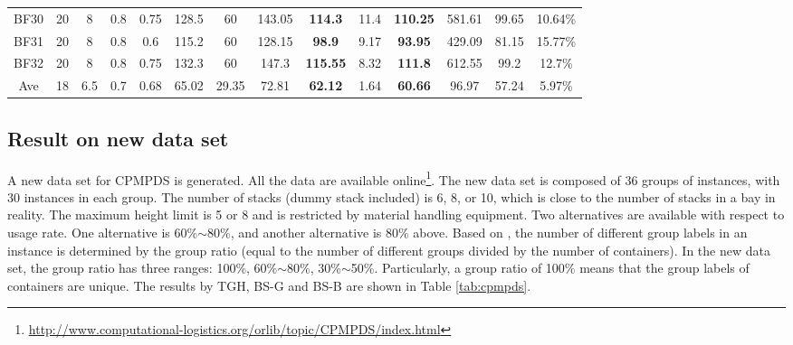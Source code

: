 \documentclass[review,3p,times,authoryear,12pt]{elsarticle}
\begin{document}
\begin{table}[!htb]
\begin{tabular}{c|c|c|c|c|c|c|c|c|c|c|c|c|c}
    BF30  & 20 & 8  & 0.8 & 0.75 & 128.5 & 60    & 143.05 &\textbf{ 114.3}& 11.4    & \textbf{110.25}& 581.61  & 99.65 & 10.64\%\\
    BF31  & 20 & 8  & 0.8 & 0.6  & 115.2 & 60    & 128.15 & \textbf{98.9} & 9.17    & \textbf{93.95} & 429.09  & 81.15 & 15.77\%\\
    BF32  & 20 & 8  & 0.8 & 0.75 & 132.3 & 60    & 147.3  & \textbf{115.55}& 8.32   & \textbf{111.8} & 612.55  & 99.2  & 12.7\%\\
    \hline
    Ave   & 18 & 6.5& 0.7 & 0.68 & 65.02 & 29.35 & 72.81  & \textbf{62.12}& 1.64    & \textbf{60.66} & 96.97   & 57.24 & 5.97\%\\
   \hline
\end{tabular}
\end{table}

\subsection {Result on new data set}

A new data set for CPMPDS is generated. All the data are available online\footnote{\url{http://www.computational-logistics.org/orlib/topic/CPMPDS/index.html}}. 
The new data set is composed of 36 groups of instances, with 30 instances in each group.
The number of stacks (dummy stack included) is 6, 8, or 10, which is close to the number of stacks in a bay in reality. 
The maximum height limit is 5 or 8 and is restricted by material handling equipment.
Two alternatives are available with respect to usage rate. One alternative is 60\%$\sim$80\%, and another alternative is 80\% above. 
Based on \cite{BF2012}, the number of different group labels in an instance is determined by the group ratio (equal to the number of different groups divided by the number of containers). 
In the new data set, the group ratio has three ranges: 100\%, 60\%$\sim$80\%, 30\%$\sim$50\%. 
Particularly, a group ratio of 100\% means that the group labels of containers are unique. 
The results by TGH, BS-G and BS-B are shown in Table \ref{tab:cpmpds}.
\end{document}
